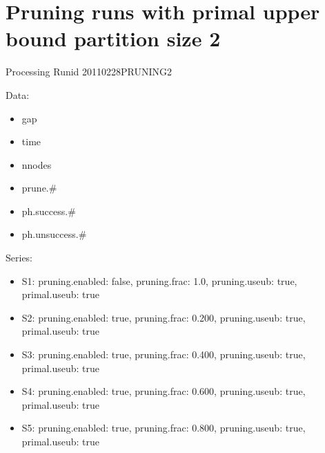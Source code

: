 \documentclass[landscape, 12pt]{report}
\begin{document}
\section{Pruning runs with primal upper bound partition size 2}

Processing Runid 20110228PRUNING2

Data:
\begin{itemize}
\item gap
\item time
\item nnodes
\item prune.\#
\item ph.success.\#
\item ph.unsuccess.\#
\end{itemize}
Series:
\begin{itemize}
\item S1: pruning.enabled: false, pruning.frac: 1.0, pruning.useub: true, primal.useub: true
\item S2: pruning.enabled: true, pruning.frac: 0.200, pruning.useub: true, primal.useub: true
\item S3: pruning.enabled: true, pruning.frac: 0.400, pruning.useub: true, primal.useub: true
\item S4: pruning.enabled: true, pruning.frac: 0.600, pruning.useub: true, primal.useub: true
\item S5: pruning.enabled: true, pruning.frac: 0.800, pruning.useub: true, primal.useub: true
\end{itemize}
\end{document}
